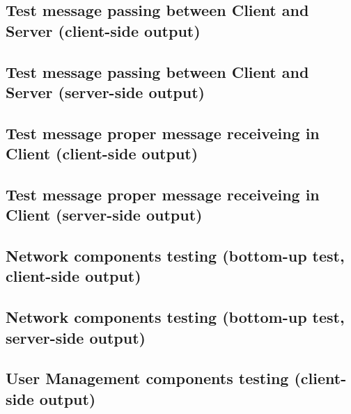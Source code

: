 {\newpage

	\subsection{ Test message passing between Client and Server (client-side output) }
	

\newpage

	\subsection{ Test message passing between Client and Server (server-side output) }
	

\newpage

	\subsection{ Test message proper message receiveing in Client (client-side output) }
	

\newpage

	\subsection{ Test message proper message receiveing in Client (server-side output) }
	

\newpage

	\subsection{ Network components testing (bottom-up test, client-side output) }
	

\newpage

	\subsection{ Network components testing (bottom-up test, server-side output)}
	

\newpage

	\subsection{ User Management components testing (client-side output) }
	

}
